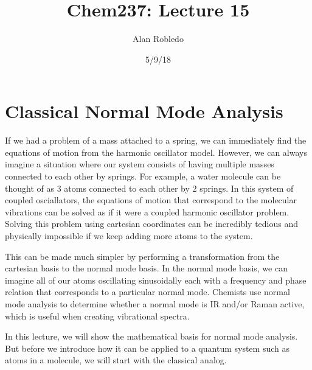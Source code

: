 \documentclass{article}
\title{Chem237: Lecture 15}
\date{5/9/18}
\author{Alan Robledo}
\begin{document}
\maketitle

\section{Classical Normal Mode Analysis}
If we had a problem of a mass attached to a spring, we can immediately find the equations of motion from the harmonic oscillator model.
However, we can always imagine a situation where our system consists of having multiple masses connected to each other by springs.
For example, a water molecule  can be thought of as 3 atoms connected to each other by 2 springs.
In this system of coupled osciallators, the equations of motion that correspond to the molecular vibrations can be solved as if it were a coupled harmonic oscillator problem.
Solving this problem using cartesian coordinates can be incredibly tedious and physically impossible if we keep adding more atoms to the system.

This can be made much simpler by performing a transformation from the cartesian basis to the normal mode basis.
In the normal mode basis, we can imagine all of our atoms oscillating sinusoidally each with a frequency and phase relation that corresponds to a particular normal mode.
Chemists use normal mode analysis to determine whether a normal mode is IR and/or Raman active, which is useful when creating vibrational spectra.

In this lecture, we will show the mathematical basis for normal mode analysis.
But before we introduce how it can be applied to a quantum system such as atoms in a molecule, we will start with the classical analog.
\end{document}
